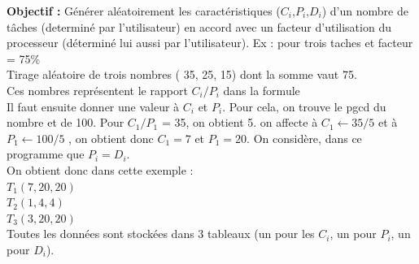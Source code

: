 			\textbf{Objectif :} Générer aléatoirement les caractéristiques ($C_i$,$P_i$,$D_i$) d’un nombre de tâches (determiné par l’utilisateur) en accord avec un facteur d’utilisation du processeur (déterminé lui aussi par l’utilisateur).
			Ex : pour trois taches et facteur = 75\% \\ 


		    Tirage aléatoire de trois nombres ( 35, 25, 15) dont la somme vaut 75. \\
		    Ces nombres représentent le rapport $C_i/P_i$ dans la formule  \\
		    Il faut ensuite donner une valeur à $C_i$ et $P_i$. Pour cela, on trouve le pgcd du nombre et de 100. Pour $C_1/P_1$ = 35, on obtient 5.  on affecte à $C_1 \leftarrow 35/5$ et à $P_1 \leftarrow 100/5$ , on obtient donc $C_1 = 7$ et $P_1 = 20$. On considère, dans ce programme que $P_i = D_i$. \\
		    
		    On obtient donc dans cette exemple :  \\
		    $T_1(7,20,20)$ \\
		    $T_2(1,4,4)$ \\
		    $T_3(3,20,20)$ \\

		    Toutes les données sont stockées dans 3 tableaux (un pour les $C_i$, un pour $P_i$, un pour $D_i$). 

